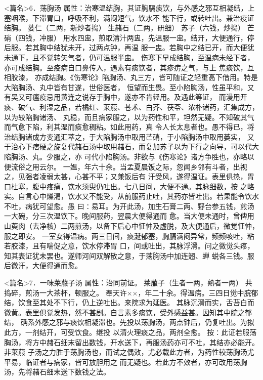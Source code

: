 \documentclass[a4paper,12pt,UTF8,twoside]{ctexbook}
\begin{document}
<篇名>6．荡胸汤
属性：治寒温结胸，其证胸膈痰饮，与外感之邪互相凝结，上塞咽喉，下滞胃口，呼吸不利，满闷短气，饮水不 
能下行，或转吐出。兼治疫证结胸。 
蒌仁（二两，新炒者捣） 生赭石（二两，研细） 苏子（六钱，炒捣） 芒硝（四钱，冲服） 
用水四盅，煎取清汁两盅，先温服一盅。结开，大便通行，停后服。若其胸中结犹未开，过两点钟，再温 
服一盅。若胸中之结已开，而大便犹未通下，且不觉转矢气者，仍可温服半盅。 
伤寒下早成结胸，至温病未经下者，亦可成结胸。至疫病自口鼻传入，遇素有痰饮者，其疹疠之气，与上 
焦痰饮，互相胶漆， 
亦成结胸。《伤寒论》陷胸汤、丸三方，皆可随证之轻重高下借用。特是大陷胸汤、丸中皆有甘遂，世俗医者， 
恒望而生畏。至小陷胸汤，性虽平和，又有吴又可瘟疫忌用黄连之说存于胸中，遂亦不肯轻用。及遇此等证， 
而漫用开痰、破气、利湿之品，若橘红、莱菔、苍术、白芥、茯苓、浓朴诸药，汇集成方，以为较陷胸诸汤、 
丸稳，而且病家服之，以为药性和平，坦然无疑。不知破其气而气愈下陷，利其湿而痰愈稠粘。如此用药，真 
令人长太息者也。愚不得已，将治结胸诸成方变通汇萃之，于大陷胸汤中取用芒硝，于小陷胸汤中取用蒌实， 
又于治心下痞硬之旋复代赭石汤中取用赭石，而复加苏子以为下行之向导，可以代大陷胸汤、丸。少服之，亦 
可代小陷胸汤。非欲与《伤寒论》诸方争胜也，亦略以便流俗之用云尔。 
一媪，年六十余。当孟夏晨饭之际，忽闻乡邻有斗者，出视之，见强者凌弱太甚，心甚不平；又兼饭后有 
汗受风，遂得温证。表里俱热，胃口杜塞，腹中疼痛，饮水须臾仍吐出。七八日间，大便不通。其脉细数，按 
之略实。自言心中燥渴，饮水又不能受，从前服药止吐，其药亦皆吐出。若果能令饮水不吐，病犹可望愈。愚 
曰∶易耳。为开此汤，加生石膏二两、野台参五钱，煎汤一大碗，分三次温饮下。晚间服药，翌晨大便得通而 
愈。当大便未通时，曾俾用山萸肉（去净核）二两煎汤，以备下后心中怔忡及虚脱，及大便通后，微觉怔忡， 
服之即安。 
一室女得温病。两三日间，痰涎郁塞，胸膈满闷异常，频频咳吐，粘若胶漆，且有喘促之意，饮水停滞胃 
口，间或吐出，其脉浮滑。问之微觉头疼，知其表证犹未罢也。遂师河间双解散之意，于荡胸汤中加连翘、蝉 
蜕各三钱。服后微汗，大便得通而愈。 


<篇名>7．一味莱菔子汤
属性：治同前证。 
莱菔子（生者一两，熟者一两） 共捣碎，煎汤一大茶杯，顿服之。 
奉天许××，年二十余。得温病。三四日觉中脘郁结，饮食至其处不下行，仍上逆吐出。来院求为延医。 
其脉沉滑而实，舌苔白而微黄。表里俱觉发热，然不甚剧。自言素多痰饮，受外感益甚。因知其中脘之郁结， 
确系外感之邪与痰饮相凝滞也。先投以荡胸汤，两点钟后，仍复吐出。为拟此方，一剂结开，可受饮食。继投 
以清火理痰之品，两剂全愈。 
按∶此证若服荡胸汤，将方中赭石细末留出数钱，开水送下，再服汤药亦可不吐，其结亦必能开。非莱菔 
子汤之力胜于荡胸汤也，而试之偶效，尤必载此方者，为药性较荡胸汤尤平易，临证者与病家，皆可放胆用之 
而无疑也。若此方不效者，亦可改用荡胸汤，先将赭石细末送下数钱之法。 
\end{document}
